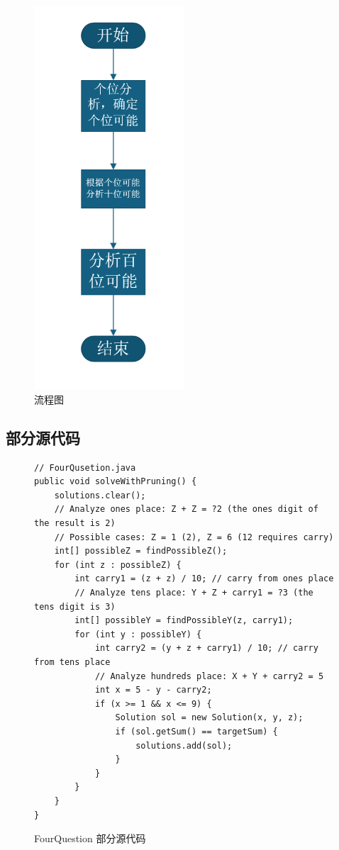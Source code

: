 \documentclass[12pt,a4paper]{article}
\begin{document}
\begin{figure}[H]
\centering
\includegraphics[width=0.5\textwidth]{four1.png}
\caption{流程图}
\end{figure}

\subsection*{部分源代码}
\begin{figure}[H]
\centering
\begin{lstlisting}
// FourQusetion.java
public void solveWithPruning() {
    solutions.clear();
    // Analyze ones place: Z + Z = ?2 (the ones digit of the result is 2)
    // Possible cases: Z = 1 (2), Z = 6 (12 requires carry)
    int[] possibleZ = findPossibleZ();
    for (int z : possibleZ) {
        int carry1 = (z + z) / 10; // carry from ones place
        // Analyze tens place: Y + Z + carry1 = ?3 (the tens digit is 3)
        int[] possibleY = findPossibleY(z, carry1);
        for (int y : possibleY) {
            int carry2 = (y + z + carry1) / 10; // carry from tens place
            // Analyze hundreds place: X + Y + carry2 = 5
            int x = 5 - y - carry2;
            if (x >= 1 && x <= 9) {
                Solution sol = new Solution(x, y, z);
                if (sol.getSum() == targetSum) {
                    solutions.add(sol);
                }
            }
        }
    }
}

\end{lstlisting}

\caption{FourQuestion 部分源代码}
\end{figure}
\end{document}

